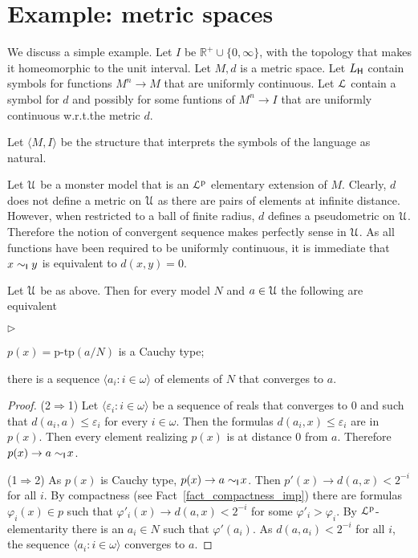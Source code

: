 \documentclass[10pt,oneside]{amsproc}
\newcommand{\mylabel}[1]{{#1}\hfill}
\renewenvironment{itemize}
  {\begin{list}{$\triangleright$}{%
  \setlength{\parskip}{0mm}
  \setlength{\topsep}{.4\baselineskip}
  \setlength{\rightmargin}{0mm}
  \setlength{\listparindent}{0mm}
  \setlength{\itemindent}{0mm}
  \setlength{\labelwidth}{3ex}
  \setlength{\itemsep}{.2\baselineskip}
  \setlength{\parsep}{.2\baselineskip}
  \setlength{\partopsep}{0mm}
  \setlength{\labelsep}{1ex}
  \setlength{\leftmargin}{\labelwidth+\labelsep}
  \let\makelabel\mylabel}}{%
\end{list}}
\begin{document}
\section{Example: metric spaces}

We discuss a simple example.
Let $I$ be $\mathds{R}^+\cup\{0,\infty\}$, with the topology that makes it homeomorphic to the unit interval.
Let $M,d$ is a metric space.
Let $L_{\sf H}$ contain symbols for functions $M^n\to M$ that are uniformly continuous.
Let ${\EuScript L}$ contain a symbol for $d$ and possibly for some funtions of $M^n\to I$ that are uniformly continuous w.r.t.\@ the metric $d$.

Let $\langle M,I\rangle$ be the structure that interprets the symbols of the language as natural.

Let ${\EuScript U}$ be a monster model that is  an ${\EuScript L}^{\rm p}$ elementary extension of $M$.
Clearly, $d$ does not define a metric on ${\EuScript U}$ as there are pairs of elements at infinite distance.
However, when restricted to a ball of finite radius, $d$ defines a pseudometric on ${\EuScript U}$.
Therefore the notion of convergent sequence makes perfectly sense in ${\EuScript U}$.
As all functions have been required to be uniformly continuous, it is immediate that $x\sim_{\sf I}y$ is equivalent to $d(x,y)=0$.

\begin{fact}
  Let $ {\EuScript U}$ be as above.
  Then for every model $N$ and $a\in{\EuScript U}$ the following are equivalent
  \begin{itemize}
    \item[1.] $p(x)=\mbox{p-tp}(a/N)$ is a Cauchy type;
    \item[2.] there is a sequence $\langle a_i: i\in\omega\rangle$ of elements of $N$ that converges to $a$.
  \end{itemize} 
\end{fact}

\begin{proof}

  (2$\Rightarrow$1) 
  Let $\langle \varepsilon_i: i\in\omega\rangle$ be a sequence of reals that converges to $0$ and such that $d(a_i,a)\le\varepsilon_i$ for every $i\in\omega$.
  Then the formulas $d(a_i,x)\le\varepsilon_i$ are in $p(x)$.
  Then every element realizing $p(x)$ is at distance $0$ from $a$.
  Therefore  $p(x)\rightarrow a\sim_{\sf I}\!x$.

  (1$\Rightarrow$2) 
  As $p(x)$ is Cauchy type, $p(x)\rightarrow a\sim_{\sf I}\!x$.
  Then $p'(x)\rightarrow d(a,x)<2^{-i}$ for all $i$.
  By compactness (see Fact~\ref{fact_compactness_imp}) there are formulas $\varphi_i(x)\in p$ such that $\varphi'_i(x)\rightarrow d(a,x)<2^{-i}$ for some $\varphi'_i>\varphi_i$.
  By ${\EuScript L}^{\rm p}$-elementarity there is an $a_i\in N$ such that $\varphi'(a_i)$.
  As $d(a,a_i)<2^{-i}$ for all $i$, the sequence $\langle a_i: i\in\omega\rangle$ converges to $a$.
\end{proof}
\end{document}
